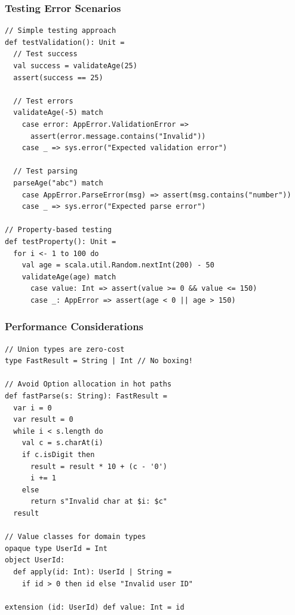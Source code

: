 \documentclass{beamer}
\begin{document}
\begin{frame}[fragile]
\frametitle{Testing Error Scenarios}

\begin{lstlisting}[style=scalaStyle]
// Simple testing approach
def testValidation(): Unit =
  // Test success
  val success = validateAge(25)
  assert(success == 25)
  
  // Test errors
  validateAge(-5) match
    case error: AppError.ValidationError => 
      assert(error.message.contains("Invalid"))
    case _ => sys.error("Expected validation error")
  
  // Test parsing
  parseAge("abc") match
    case AppError.ParseError(msg) => assert(msg.contains("number"))
    case _ => sys.error("Expected parse error")

// Property-based testing
def testProperty(): Unit =
  for i <- 1 to 100 do
    val age = scala.util.Random.nextInt(200) - 50
    validateAge(age) match
      case value: Int => assert(value >= 0 && value <= 150)
      case _: AppError => assert(age < 0 || age > 150)
\end{lstlisting}

\end{frame}

\begin{frame}[fragile]
\frametitle{Performance Considerations}

\begin{lstlisting}[style=scalaStyle]
// Union types are zero-cost
type FastResult = String | Int // No boxing!

// Avoid Option allocation in hot paths
def fastParse(s: String): FastResult =
  var i = 0
  var result = 0
  while i < s.length do
    val c = s.charAt(i)
    if c.isDigit then
      result = result * 10 + (c - '0')
      i += 1
    else
      return s"Invalid char at $i: $c"
  result

// Value classes for domain types
opaque type UserId = Int
object UserId:
  def apply(id: Int): UserId | String = 
    if id > 0 then id else "Invalid user ID"
  
extension (id: UserId) def value: Int = id
\end{lstlisting}

\end{frame}
\end{document}
